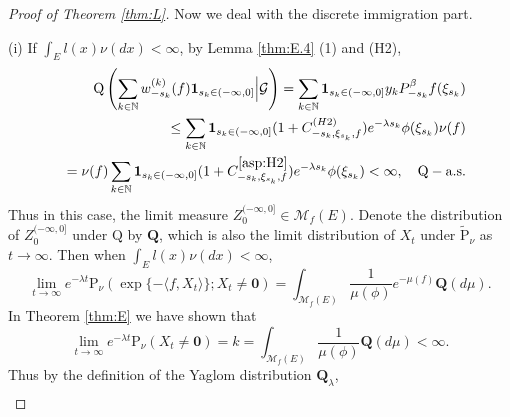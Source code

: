 \documentclass[12pt,a4paper]{amsart}
\numberwithin{equation}{section}
\theoremstyle{plain}
\theoremstyle{definition}
\theoremstyle{remark}
\begin{document}
\begin{proof}[Proof of Theorem \ref{thm:L}]
Now we deal with the discrete immigration part.


(i) If  $\int_E l(x) \nu(dx)<\infty$,
 by Lemma \ref{thm:E.4} (1) and (H2),
\begin{eqnarray*}
&&\mathrm Q\left( \sum_{k\in\mathbb N}w^{(k)}_{-s_k}(f)\mathbf 1_{s_k\in (-\infty, 0]}\Big|\mathcal G\right)=\sum_{k\in\mathbb N}\mathbf 1_{s_k\in (-\infty, 0]}y_kP^{\beta}_{-s_k}f( \xi_{s_k})\\
&&\leq\sum_{k\in\mathbb N}\mathbf 1_{s_k\in (-\infty, 0]}(1+C^{(H2)}_{-s_k, \xi_{s_k}, f})
e^{-\lambda s_k}\phi(\xi_{s_k})\nu(f)\\
&&=\nu(f)\sum_{k\in\mathbb N}\mathbf 1_{s_k\in (-\infty, 0]}(1+C^{\eqref{asp:H2}}_{-s_k, \xi_{s_k}, f})
e^{-\lambda s_k}\phi(\xi_{s_k})<\infty, \quad \mathrm Q-\text{a.s.}
\end{eqnarray*}
 Thus in this case, the limit measure 
$Z_0^{(-\infty, 0]}\in \mathcal M_f(E)$.
 Denote the distribution of $Z_0^{(-\infty, 0]}$ under
  ${\mathrm Q}$ by $\mathbf Q$,
  which is also the limit distribution of $X_t$ under $\widetilde{\mathrm P}_\nu$ as $t\to\infty$.  Then when
$\int_E l(x)\nu(dx)<\infty$,
\[
\lim_{t\rightarrow\infty}e^{-\lambda t}\mathrm P_\nu\left(\exp\{-\langle f, X_t\rangle \};
X_t\neq \mathbf 0\right)=
\int_{{\mathcal M}_f(E)}\frac{1}{\mu(\phi)}e^{-\mu(f)}\mathbf Q(d\mu).
\]
In Theorem \ref{thm:E} we have shown that
\[
\lim_{t\rightarrow\infty}e^{-\lambda t}\mathrm P_\nu(X_t\neq \mathbf 0)=k
=\int_{{\mathcal M}_f(E)}\frac{1}{\mu(\phi)}\mathbf Q(d\mu)<\infty.
\]
Thus by the definition of the Yaglom distribution ${\mathbf Q}_\lambda $,
\begin{align*}

\end{align*}
\end{proof}
\end{document}
